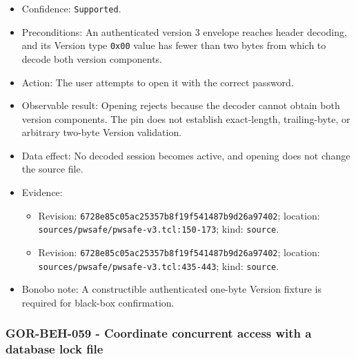 \documentclass[
  letterpaper,
]{article}
\newcommand{\passthrough}[1]{#1}
\providecommand{\tightlist}{%
  \setlength{\itemsep}{0pt}\setlength{\parskip}{0pt}}
\begin{document}
\begin{itemize}
\tightlist
\item
  Confidence: \passthrough{\lstinline!Supported!}.
\item
  Preconditions: An authenticated version 3 envelope reaches header decoding, and its Version type
  \passthrough{\lstinline!0x00!} value has fewer than two bytes from which to decode both version components.
\item
  Action: The user attempts to open it with the correct password.
\item
  Observable result: Opening rejects because the decoder cannot obtain both version components. The pin does not
  establish exact-length, trailing-byte, or arbitrary two-byte Version validation.
\item
  Data effect: No decoded session becomes active, and opening does not change the source file.
\item
  Evidence:

  \begin{itemize}
  \tightlist
  \item
    Revision: \nolinkurl{6728e85c05ac25357b8f19f541487b9d26a97402}; location:
    \nolinkurl{sources/pwsafe/pwsafe-v3.tcl:150-173}; kind: \passthrough{\lstinline!source!}.
  \item
    Revision: \nolinkurl{6728e85c05ac25357b8f19f541487b9d26a97402}; location:
    \nolinkurl{sources/pwsafe/pwsafe-v3.tcl:435-443}; kind: \passthrough{\lstinline!source!}.
  \end{itemize}
\item
  Bonobo note: A constructible authenticated one-byte Version fixture is required for black-box confirmation.
\end{itemize}

\subsubsection{GOR-BEH-059 - Coordinate concurrent access with a database lock
file}\label{gor-beh-059---coordinate-concurrent-access-with-a-database-lock-file}
\end{document}
